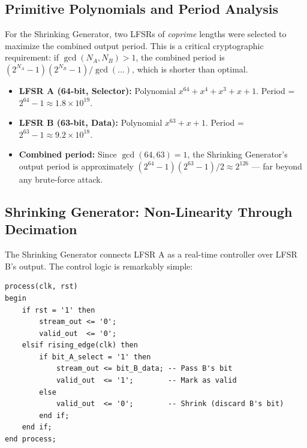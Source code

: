 \documentclass[conference, a4paper]{IEEEtran}
\begin{document}
\subsection{Primitive Polynomials and Period Analysis}

For the Shrinking Generator, two LFSRs of \textit{coprime} lengths were selected to maximize the combined output period. This is a critical cryptographic requirement: if $\gcd(N_A, N_B) > 1$, the combined period is $(2^{N_A}-1)(2^{N_B}-1) / \gcd(\ldots)$, which is shorter than optimal.

\begin{itemize}
    \item \textbf{LFSR A (64-bit, Selector):} Polynomial $x^{64} + x^4 + x^3 + x + 1$. Period = $2^{64} - 1 \approx 1.8 \times 10^{19}$.
    \item \textbf{LFSR B (63-bit, Data):} Polynomial $x^{63} + x + 1$. Period = $2^{63} - 1 \approx 9.2 \times 10^{18}$.
    \item \textbf{Combined period:} Since $\gcd(64, 63) = 1$, the Shrinking Generator's output period is approximately $(2^{64}-1)(2^{63}-1)/2 \approx 2^{126}$ — far beyond any brute-force attack.
\end{itemize}

\subsection{Shrinking Generator: Non-Linearity Through Decimation}

The Shrinking Generator connects LFSR A as a real-time controller over LFSR B's output. The control logic is remarkably simple:

\begin{lstlisting}[style=vhdlstyle, caption={Shrinking Generator — Asynchronous Master-Slave LFSR}, label={lst:shrink}]
process(clk, rst)
begin
    if rst = '1' then
        stream_out <= '0';
        valid_out  <= '0';
    elsif rising_edge(clk) then
        if bit_A_select = '1' then
            stream_out <= bit_B_data; -- Pass B's bit
            valid_out  <= '1';        -- Mark as valid
        else
            valid_out  <= '0';        -- Shrink (discard B's bit)
        end if;
    end if;
end process;
\end{lstlisting}
\end{document}
